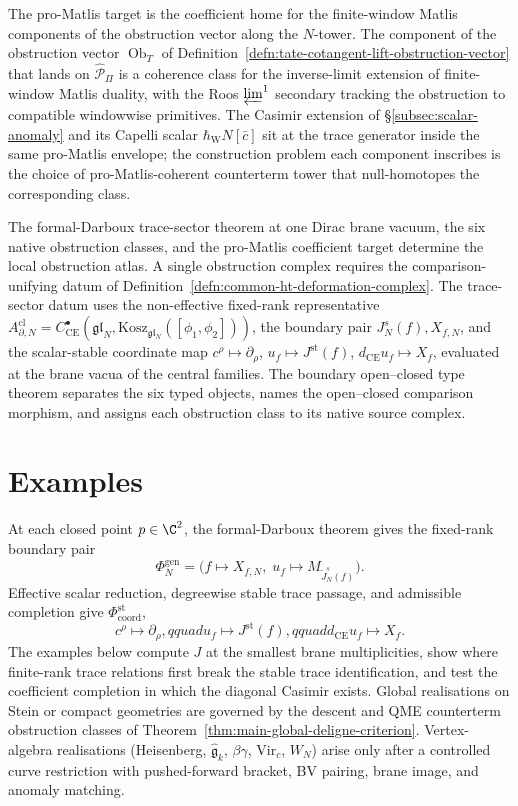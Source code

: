 \documentclass[11pt]{memoir}
\begin{document}
The pro-Matlis target is the coefficient home for the finite-window
Matlis components of the obstruction vector along the \(N\)-tower.
The component of the obstruction vector \(\operatorname{Ob}_T\) of
Definition~\ref{defn:tate-cotangent-lift-obstruction-vector} that lands
on \(\widehat{\mathcal P}_\Pi\) is a coherence class for the
inverse-limit extension of finite-window Matlis duality, with the Roos
\(\varprojlim^1\) secondary tracking the obstruction to compatible
windowwise primitives.
The Casimir extension of \S\ref{subsec:scalar-anomaly} and its Capelli
scalar \(\hbar_{\mathrm{W}}N[\bar c]\) sit at the trace
generator inside the same pro-Matlis envelope; the construction
problem each component inscribes is the choice of pro-Matlis-coherent
counterterm tower that null-homotopes the corresponding class.



The formal-Darboux trace-sector theorem at one Dirac brane vacuum, the
six native obstruction classes, and the pro-Matlis coefficient target
determine the local obstruction atlas.  A single obstruction complex
requires the comparison-unifying datum of
Definition~\ref{defn:common-ht-deformation-complex}.  The trace-sector datum
  uses the non-effective fixed-rank representative
\(A^{\mathrm{cl}}_{\partial,N}=
C^\bullet_{\mathrm{CE}}
(\mathfrak{gl}_N,\mathrm{Kosz}_{\mathfrak{gl}_N}([\phi_1,\phi_2]))\),
  the boundary pair \(J_N^s(f),X_{f,N}\), and the scalar-stable
  coordinate map
\(c^\rho\mapsto\partial_\rho\),
\(u_f\mapsto J^{\mathrm{st}}(f)\),
\(d_{\mathrm{CE}}u_f\mapsto X_f\), evaluated at the brane
vacua of the central families.  The boundary open--closed type theorem
separates the six typed objects,
names the open--closed comparison morphism, and assigns each obstruction
class to its native source complex.



\section{Examples}\label{sec:examples}\label{ssec:examples}

At each closed point \(p\in\C^2\), the formal-Darboux theorem gives the
fixed-rank boundary pair
\[
  \Phi_N^{\mathrm{gen}}
  =\bigl(f\mapsto X_{f,N},\;
    u_f\mapsto M_{\widetilde J_N^s(f)}\bigr).
\]
Effective scalar reduction, degreewise stable trace passage, and
admissible completion give \(\Phi_{\mathrm{coord}}^{\mathrm{st}}\),
\[
  c^\rho\mapsto\partial_\rho,qquad
  u_f\mapsto J^{\mathrm{st}}(f),qquad
  d_{\mathrm{CE}}u_f\mapsto X_f.
\]
The
examples below compute \(J\) at the smallest brane multiplicities, show
where finite-rank trace relations first break the stable trace
identification, and test the coefficient completion in which the
diagonal Casimir exists.  Global realisations on Stein or compact
geometries are
governed by the descent and QME counterterm obstruction classes of
Theorem~\ref{thm:main-global-deligne-criterion}.
Vertex-algebra
realisations (Heisenberg, \(\widehat{\mathfrak g}_k\), \(\beta\gamma\),
\(\mathrm{Vir}_c\), \(W_N\)) arise only after a controlled curve
restriction with pushed-forward bracket, BV pairing, brane image, and
anomaly matching.
\end{document}
